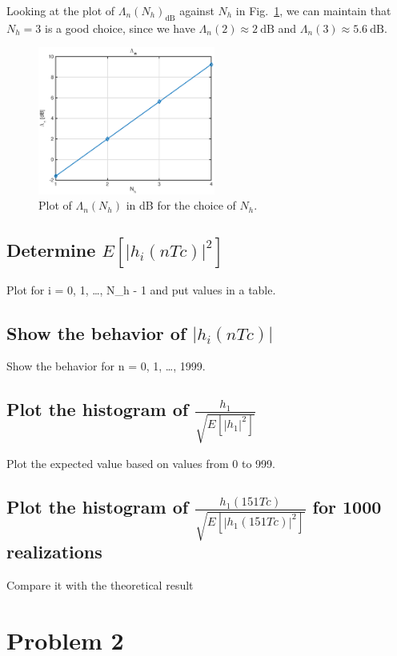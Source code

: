 \documentclass[10pt]{article}
\newcommand{\dB} {\mathrm{dB}}
\numberwithin{equation}{section}
\begin{document}
Looking at the plot of $\Lambda_n (N_h)_{\dB}$ against $N_h$ in Fig.~\ref{fig:p01_lambda_n}, we can maintain that $N_h = 3$ is a good choice, since we have $\Lambda_n(2) \approx 2~\dB$ and $\Lambda_n(3) \approx 5.6~\dB$.

\begin{figure}[ht]
	\centering
	\includegraphics[width=0.52\textwidth]{p01_lambda_n}
	\caption{Plot of $\Lambda_n (N_h)$ in dB for the choice of $N_h$.}
    \label{fig:p01_lambda_n}
\end{figure}

\subsection*{Determine $E[|h_i(nTc)|^2]$}
Plot for i = 0, 1, \dots, N_h - 1 and put values in a table.

\subsection*{Show the behavior of $|h_i(nTc)|$}
Show the behavior for n = 0, 1, \dots, 1999.

\subsection*{Plot the histogram of $\frac{h_1}{\sqrt{E[|h_1|^2]}}$}
Plot the expected value based on values from 0 to 999.

\subsection*{Plot the histogram of $\frac{h_1(151Tc)}{\sqrt{E[|h_1(151Tc)|^2]}}$ for 1000 realizations}
Compare it with the theoretical result

\section*{Problem 2}
\end{document}

